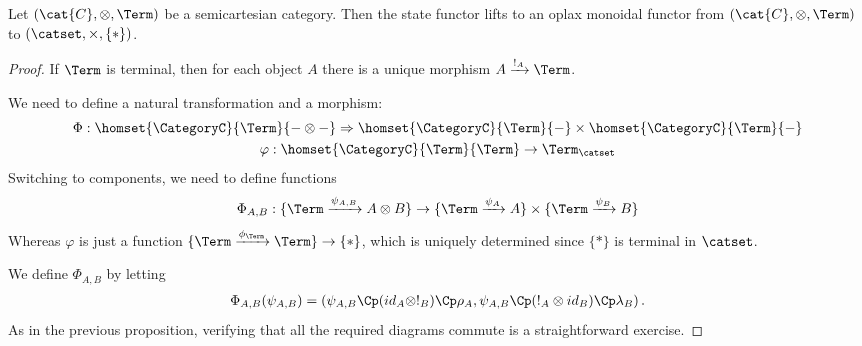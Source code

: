     \begingroup
    \def\theproposition{\ref{prop: state functor oplax}}
    \begin{proposition}
        Let $(\cat{C}, \otimes, \Term)$ be a semicartesian category.
        Then the state functor lifts to an oplax monoidal functor from $(\cat{C}, \otimes, \Term)$ to $(\catset, \times, \{*\})$.
    \end{proposition}
    \addtocounter{proposition}{-1}
    \endgroup
    \begin{proof}
        If $\Term$ is terminal, then for each object $A$ there is a unique morphism $A \xrightarrow{!_A} \Term$.

        We need to define a natural transformation and a morphism:
        \begin{gather*}
            \Phi : \homset{\CategoryC}{\Term}{- \otimes -} \Rightarrow \homset{\CategoryC}{\Term}{-} \times \homset{\CategoryC}{\Term}{-}\\
            \varphi : \homset{\CategoryC}{\Term}{\Term} \to \Term_{\catset}
        \end{gather*}
        Switching to components, we need to define functions
        \begin{equation*}
            \Phi_{A,B} :
            \{\Term \xrightarrow{\psi_{A,B}} A \otimes B \} \rightarrow \{\Term \xrightarrow{\psi_A} A \} \times \{\Term \xrightarrow{\psi_B} B \}
        \end{equation*}
        Whereas $\varphi$ is just a function $\{\Term \xrightarrow{\phi_\Term} \Term \} \rightarrow \{*\}$, which is uniquely determined since $\{*\}$ is terminal in $\catset$.

        We define $\Phi_{A,B}$ by letting
        \begin{gather*}
            \Phi_{A,B}(\psi_{A,B}) =\left(\psi_{A,B} \Cp  (id_A \otimes !_B) \Cp  \rho_A ,\psi_{A,B} \Cp  (!_A \otimes id_B) \Cp  \lambda_B\right).
        \end{gather*}
        As in the previous proposition, verifying that all the required diagrams commute is a straightforward exercise.
    \end{proof}


